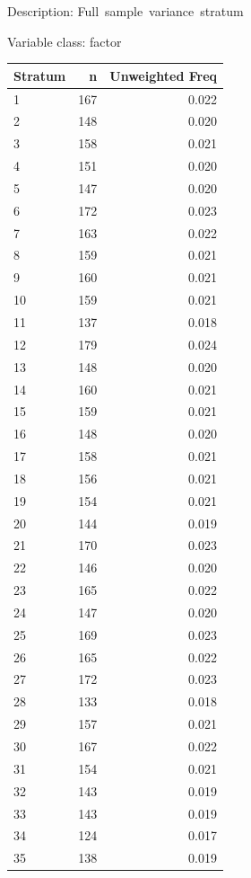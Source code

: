\documentclass[
]{krantz}
\begin{document}
Description: Full~sample~variance~stratum

Variable class: factor

\begin{tabular}[t]{l|r|r}
\hline
Stratum & n & Unweighted Freq\\
\hline
1 & 167 & 0.022\\
\hline
2 & 148 & 0.020\\
\hline
3 & 158 & 0.021\\
\hline
4 & 151 & 0.020\\
\hline
5 & 147 & 0.020\\
\hline
6 & 172 & 0.023\\
\hline
7 & 163 & 0.022\\
\hline
8 & 159 & 0.021\\
\hline
9 & 160 & 0.021\\
\hline
10 & 159 & 0.021\\
\hline
11 & 137 & 0.018\\
\hline
12 & 179 & 0.024\\
\hline
13 & 148 & 0.020\\
\hline
14 & 160 & 0.021\\
\hline
15 & 159 & 0.021\\
\hline
16 & 148 & 0.020\\
\hline
17 & 158 & 0.021\\
\hline
18 & 156 & 0.021\\
\hline
19 & 154 & 0.021\\
\hline
20 & 144 & 0.019\\
\hline
21 & 170 & 0.023\\
\hline
22 & 146 & 0.020\\
\hline
23 & 165 & 0.022\\
\hline
24 & 147 & 0.020\\
\hline
25 & 169 & 0.023\\
\hline
26 & 165 & 0.022\\
\hline
27 & 172 & 0.023\\
\hline
28 & 133 & 0.018\\
\hline
29 & 157 & 0.021\\
\hline
30 & 167 & 0.022\\
\hline
31 & 154 & 0.021\\
\hline
32 & 143 & 0.019\\
\hline
33 & 143 & 0.019\\
\hline
34 & 124 & 0.017\\
\hline
35 & 138 & 0.019\\
\hline

\end{tabular}
\end{document}
